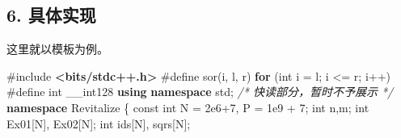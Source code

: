 \documentclass[
]{article}
\newenvironment{Shaded}{}{}
\newcommand{\AttributeTok}[1]{\textcolor[rgb]{0.49,0.56,0.16}{#1}}
\newcommand{\CommentTok}[1]{\textcolor[rgb]{0.38,0.63,0.69}{\textit{#1}}}
\newcommand{\ControlFlowTok}[1]{\textcolor[rgb]{0.00,0.44,0.13}{\textbf{#1}}}
\newcommand{\DataTypeTok}[1]{\textcolor[rgb]{0.56,0.13,0.00}{#1}}
\newcommand{\DecValTok}[1]{\textcolor[rgb]{0.25,0.63,0.44}{#1}}
\newcommand{\FloatTok}[1]{\textcolor[rgb]{0.25,0.63,0.44}{#1}}
\newcommand{\ImportTok}[1]{\textcolor[rgb]{0.00,0.50,0.00}{\textbf{#1}}}
\newcommand{\KeywordTok}[1]{\textcolor[rgb]{0.00,0.44,0.13}{\textbf{#1}}}
\newcommand{\NormalTok}[1]{#1}
\newcommand{\OperatorTok}[1]{\textcolor[rgb]{0.40,0.40,0.40}{#1}}
\newcommand{\PreprocessorTok}[1]{\textcolor[rgb]{0.74,0.48,0.00}{#1}}
\begin{document}
\subsection{6. 具体实现}\label{6-ux5177ux4f53ux5b9eux73b0}

这里就以模板为例。

\begin{Shaded}
\begin{Highlighting}[]
\PreprocessorTok{\#include }\ImportTok{\textless{}bits/stdc++.h\textgreater{}}
\PreprocessorTok{\#define sor}\OperatorTok{(}\NormalTok{i}\OperatorTok{,}\PreprocessorTok{ }\NormalTok{l}\OperatorTok{,}\PreprocessorTok{ }\NormalTok{r}\OperatorTok{)}\PreprocessorTok{ }\ControlFlowTok{for}\PreprocessorTok{ }\OperatorTok{(}\DataTypeTok{int}\PreprocessorTok{ }\NormalTok{i}\PreprocessorTok{ }\OperatorTok{=}\PreprocessorTok{ }\NormalTok{l}\OperatorTok{;}\PreprocessorTok{ }\NormalTok{i}\PreprocessorTok{ }\OperatorTok{\textless{}=}\PreprocessorTok{ }\NormalTok{r}\OperatorTok{;}\PreprocessorTok{ }\NormalTok{i}\OperatorTok{++)}
\PreprocessorTok{\#define int }\DataTypeTok{\_\_int128}
\KeywordTok{using} \KeywordTok{namespace}\NormalTok{ std}\OperatorTok{;}
\CommentTok{/*  快读部分，暂时不予展示  */}
\KeywordTok{namespace}\NormalTok{ Revitalize}
\OperatorTok{\{}
    \AttributeTok{const} \DataTypeTok{int}\NormalTok{ N }\OperatorTok{=} \FloatTok{2e6}\OperatorTok{+}\DecValTok{7}\OperatorTok{,}\NormalTok{ P }\OperatorTok{=} \FloatTok{1e9} \OperatorTok{+} \DecValTok{7}\OperatorTok{;}
    \DataTypeTok{int}\NormalTok{ n}\OperatorTok{,}\NormalTok{m}\OperatorTok{;}
    \DataTypeTok{int}\NormalTok{ Ex01}\OperatorTok{[}\NormalTok{N}\OperatorTok{],}\NormalTok{ Ex02}\OperatorTok{[}\NormalTok{N}\OperatorTok{];}
    \DataTypeTok{int}\NormalTok{ ids}\OperatorTok{[}\NormalTok{N}\OperatorTok{],}\NormalTok{ sqrs}\OperatorTok{[}\NormalTok{N}\OperatorTok{];}
 

\end{Highlighting}
\end{Shaded}
\end{document}
